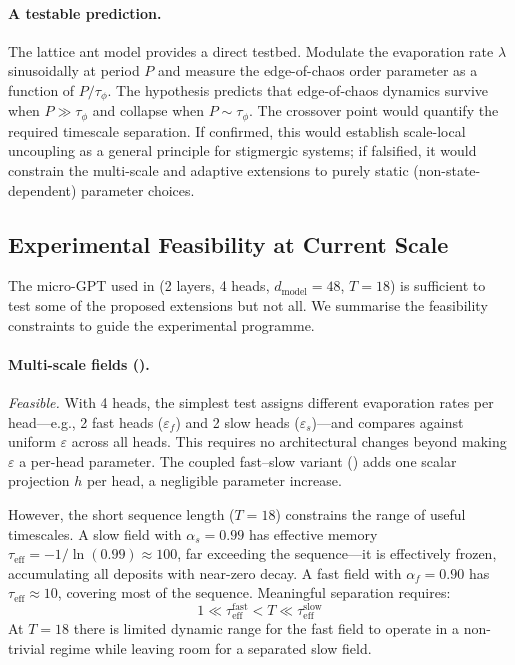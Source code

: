 \documentclass[11pt,a4paper]{article}
\newcommand{\evap}{\varepsilon}
\newcommand{\retain}{\alpha}
\begin{document}
\paragraph{A testable prediction.}
The lattice ant model provides a direct testbed.  Modulate the
evaporation rate $\lambda$ sinusoidally at period $P$ and measure the
edge-of-chaos order parameter as a function of $P / \tau_\phi$.  The
hypothesis predicts that edge-of-chaos dynamics survive when $P \gg
\tau_\phi$ and collapse when $P \sim \tau_\phi$.  The crossover
point would quantify the required timescale separation.  If
confirmed, this would establish scale-local uncoupling as a general
principle for stigmergic systems; if falsified, it would constrain
the multi-scale and adaptive extensions to purely static
(non-state-dependent) parameter choices.

\subsection{Experimental Feasibility at Current Scale}
\label{sec:feasibility}

The micro-GPT used in  (2 layers, 4 heads,
$d_{\text{model}} = 48$, $T = 18$) is sufficient to test some of
the proposed extensions but not all.  We summarise the feasibility
constraints to guide the experimental programme.

\paragraph{Multi-scale fields ().}
\emph{Feasible.}  With 4 heads, the simplest test assigns different
evaporation rates per head---e.g., 2 fast heads ($\evap_f$) and 2
slow heads ($\evap_s$)---and compares against uniform $\evap$ across
all heads.  This requires no architectural changes beyond making
$\evap$ a per-head parameter.  The coupled fast--slow variant
() adds one scalar projection $h$
per head, a negligible parameter increase.

However, the short sequence length ($T = 18$) constrains the range
of useful timescales.  A slow field with $\retain_s = 0.99$ has
effective memory $\tau_{\text{eff}} = -1/\!\ln(0.99) \approx 100$,
far exceeding the sequence---it is effectively frozen, accumulating
all deposits with near-zero decay.  A fast field with $\retain_f =
0.90$ has $\tau_{\text{eff}} \approx 10$, covering most of the
sequence.  Meaningful separation requires:
\begin{equation}
    1 \ll \tau_{\text{eff}}^{\text{fast}} < T \ll \tau_{\text{eff}}^{\text{slow}}
    \label{eq:timescale_constraint}
\end{equation}
At $T = 18$ there is limited dynamic range for the fast field to
operate in a non-trivial regime while leaving room for a separated
slow field.
\end{document}
